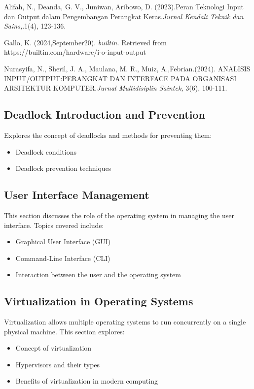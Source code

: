 \documentclass[12pt]{article}
\begin{document}
\begin{thebibliography}{10}
    Alifah, N., Deanda, G. V., Juniwan, Aribowo, D. (2023).Peran Teknologi Input dan Output dalam Pengembangan Perangkat Keras.\textit{Jurnal Kendali Teknik dan Sains,}.1(4), 123-136.

    Gallo, K. (2024,September20). \textit{builtin.} Retrieved from https://builtin.com/hardware/i-o-input-output
    
    Nurasyifa, N., Sheril, J. A., Maulana, M. R., Muiz, A.,Febrian.(2024). ANALISIS INPUT/OUTPUT:PERANGKAT DAN INTERFACE PADA ORGANISASI ARSITEKTUR KOMPUTER.\textit{Jurnal Multidisiplin Saintek,} 3(6), 100-111.

\end{thebibliography}

\pagebreak

\subsection{Deadlock Introduction and Prevention}
Explores the concept of deadlocks and methods for preventing them:
\begin{itemize}
    \item Deadlock conditions
    \item Deadlock prevention techniques
\end{itemize}

\subsection{User Interface Management}
This section discusses the role of the operating system in managing the user interface. Topics covered include:
\begin{itemize}
    \item Graphical User Interface (GUI)
    \item Command-Line Interface (CLI)
    \item Interaction between the user and the operating system
\end{itemize}

\subsection{Virtualization in Operating Systems}
Virtualization allows multiple operating systems to run concurrently on a single physical machine. This section explores:
\begin{itemize}
    \item Concept of virtualization
    \item Hypervisors and their types
    \item Benefits of virtualization in modern computing
\end{itemize}
\end{document}
